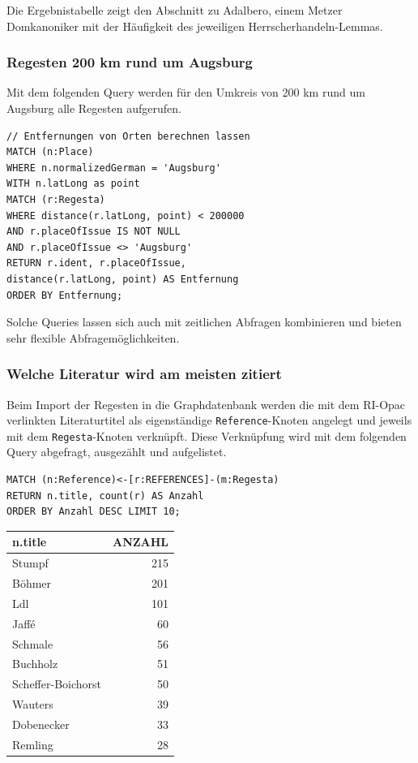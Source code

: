 \documentclass[12pt,ngerman,]{article}
\begin{document}
Die Ergebnistabelle zeigt den Abschnitt zu Adalbero, einem Metzer
Domkanoniker mit der Häufigkeit des jeweiligen Herrscherhandeln-Lemmas.

\subsubsection{Regesten 200 km rund um
Augsburg}\label{regesten-200-km-rund-um-augsburg}

Mit dem folgenden Query werden für den Umkreis von 200 km rund um
Augsburg alle Regesten aufgerufen.

\begin{verbatim}
// Entfernungen von Orten berechnen lassen
MATCH (n:Place)
WHERE n.normalizedGerman = 'Augsburg'
WITH n.latLong as point
MATCH (r:Regesta)
WHERE distance(r.latLong, point) < 200000
AND r.placeOfIssue IS NOT NULL
AND r.placeOfIssue <> 'Augsburg'
RETURN r.ident, r.placeOfIssue,
distance(r.latLong, point) AS Entfernung
ORDER BY Entfernung;
\end{verbatim}

Solche Queries lassen sich auch mit zeitlichen Abfragen kombinieren und
bieten sehr flexible Abfragemöglichkeiten.

\subsubsection{Welche Literatur wird am meisten
zitiert}\label{welche-literatur-wird-am-meisten-zitiert}

Beim Import der Regesten in die Graphdatenbank werden die mit dem
RI-Opac verlinkten Literaturtitel als eigenständige
\texttt{Reference}-Knoten angelegt und jeweils mit dem
\texttt{Regesta}-Knoten verknüpft. Diese Verknüpfung wird mit dem
folgenden Query abgefragt, ausgezählt und aufgelistet.

\begin{verbatim}
MATCH (n:Reference)<-[r:REFERENCES]-(m:Regesta)
RETURN n.title, count(r) AS Anzahl
ORDER BY Anzahl DESC LIMIT 10;
\end{verbatim}

\begin{longtable}[]{@{}lr@{}}
\toprule
n.title & ANZAHL\tabularnewline
\midrule
\endhead
Stumpf & 215\tabularnewline
Böhmer & 201\tabularnewline
Ldl & 101\tabularnewline
Jaffé & 60\tabularnewline
Schmale & 56\tabularnewline
Buchholz & 51\tabularnewline
Scheffer-Boichorst & 50\tabularnewline
Wauters & 39\tabularnewline
Dobenecker & 33\tabularnewline
Remling & 28\tabularnewline
\bottomrule
\end{longtable}
\end{document}
